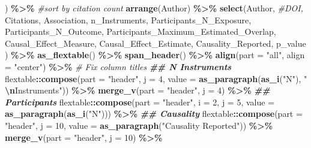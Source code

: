 \documentclass[
]{article}
\newenvironment{Shaded}{\begin{snugshade}}{\end{snugshade}}
\newcommand{\AttributeTok}[1]{\textcolor[rgb]{0.13,0.29,0.53}{#1}}
\newcommand{\CommentTok}[1]{\textcolor[rgb]{0.56,0.35,0.01}{\textit{#1}}}
\newcommand{\DecValTok}[1]{\textcolor[rgb]{0.00,0.00,0.81}{#1}}
\newcommand{\DocumentationTok}[1]{\textcolor[rgb]{0.56,0.35,0.01}{\textbf{\textit{#1}}}}
\newcommand{\FunctionTok}[1]{\textcolor[rgb]{0.13,0.29,0.53}{\textbf{#1}}}
\newcommand{\NormalTok}[1]{#1}
\newcommand{\SpecialCharTok}[1]{\textcolor[rgb]{0.81,0.36,0.00}{\textbf{#1}}}
\newcommand{\StringTok}[1]{\textcolor[rgb]{0.31,0.60,0.02}{#1}}
\begin{document}
\begin{landscape}
\begin{Shaded}
\begin{Highlighting}[]
\NormalTok{  ) }\SpecialCharTok{\%\textgreater{}\%} 
  \CommentTok{\#sort by citation count}
  \FunctionTok{arrange}\NormalTok{(Author) }\SpecialCharTok{\%\textgreater{}\%} 
  \FunctionTok{select}\NormalTok{(Author,}
         \CommentTok{\#DOI,}
\NormalTok{         Citations,}
\NormalTok{         Association,}
\NormalTok{         n\_Instruments,}
\NormalTok{         Participants\_N\_Exposure,}
\NormalTok{         Participants\_N\_Outcome,}
\NormalTok{         Participants\_Maximum\_Estimated\_Overlap,}
\NormalTok{         Causal\_Effect\_Measure,}
\NormalTok{         Causal\_Effect\_Estimate,}
\NormalTok{         Causality\_Reported,}
\NormalTok{         p\_value}
\NormalTok{         ) }\SpecialCharTok{\%\textgreater{}\%} 
  \FunctionTok{as\_flextable}\NormalTok{() }\SpecialCharTok{\%\textgreater{}\%} 
  \FunctionTok{span\_header}\NormalTok{() }\SpecialCharTok{\%\textgreater{}\%} 
  \FunctionTok{align}\NormalTok{(}\AttributeTok{part =} \StringTok{"all"}\NormalTok{, }\AttributeTok{align =} \StringTok{"center"}\NormalTok{) }\SpecialCharTok{\%\textgreater{}\%} 
  \CommentTok{\# Fix column titles}
  \DocumentationTok{\#\# N Instruments}
\NormalTok{  flextable}\SpecialCharTok{::}\FunctionTok{compose}\NormalTok{(}\AttributeTok{part =} \StringTok{"header"}\NormalTok{, }\AttributeTok{j =} \DecValTok{4}\NormalTok{, }\AttributeTok{value =} \FunctionTok{as\_paragraph}\NormalTok{(}\FunctionTok{as\_i}\NormalTok{(}\StringTok{"N"}\NormalTok{), }\StringTok{" }\SpecialCharTok{\textbackslash{}n}\StringTok{Instruments"}\NormalTok{)) }\SpecialCharTok{\%\textgreater{}\%} 
  \FunctionTok{merge\_v}\NormalTok{(}\AttributeTok{part =} \StringTok{"header"}\NormalTok{, }\AttributeTok{j =} \DecValTok{4}\NormalTok{) }\SpecialCharTok{\%\textgreater{}\%} 
  \DocumentationTok{\#\# Participants}
\NormalTok{  flextable}\SpecialCharTok{::}\FunctionTok{compose}\NormalTok{(}\AttributeTok{part =} \StringTok{"header"}\NormalTok{, }\AttributeTok{i =} \DecValTok{2}\NormalTok{, }\AttributeTok{j =} \DecValTok{5}\NormalTok{, }\AttributeTok{value =} \FunctionTok{as\_paragraph}\NormalTok{(}\FunctionTok{as\_i}\NormalTok{(}\StringTok{"N"}\NormalTok{))) }\SpecialCharTok{\%\textgreater{}\%}
  \DocumentationTok{\#\# Causality}
\NormalTok{  flextable}\SpecialCharTok{::}\FunctionTok{compose}\NormalTok{(}\AttributeTok{part =} \StringTok{"header"}\NormalTok{, }\AttributeTok{j =} \DecValTok{10}\NormalTok{, }\AttributeTok{value =} \FunctionTok{as\_paragraph}\NormalTok{(}\StringTok{"Causality Reported"}\NormalTok{)) }\SpecialCharTok{\%\textgreater{}\%} 
  \FunctionTok{merge\_v}\NormalTok{(}\AttributeTok{part =} \StringTok{"header"}\NormalTok{, }\AttributeTok{j =} \DecValTok{10}\NormalTok{) }\SpecialCharTok{\%\textgreater{}\%} 

\end{Highlighting}
\end{Shaded}
\end{landscape}
\end{document}
